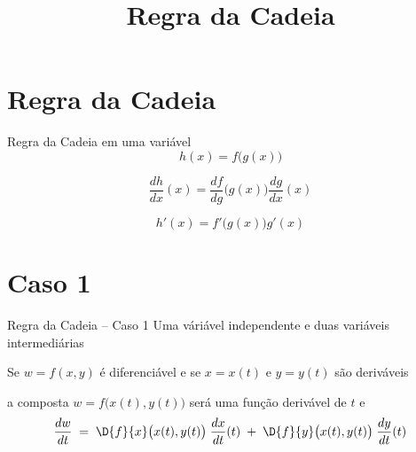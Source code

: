 
\usepackage{calculo_varias_variaveis-1}

\title {Regra da Cadeia}



\addtitle

\section{Regra da Cadeia}

\begin{frame}{Regra da Cadeia em uma variável}
    \[
        h(x) = f\big(g(x)\big)
    \]

    \pause
    \vspace{\baselineskip}
    \[
        \frac{dh}{dx}(x) = \frac{df}{dg}\big(g(x)\big)\frac{dg}{dx}(x)
    \]

    \pause
    \vspace{\baselineskip}
    \[
        h'(x) = f'\big(g(x)\big) g'(x)
    \]
\end{frame}

\section{Caso 1}

\begin{frame}{Regra da Cadeia -- Caso 1}
    Uma váriável independente e duas variáveis intermediárias
    \vspace{\baselineskip}

    \pause
    Se \(w=f(x, y)\) é diferenciável
    \pause
    e se \(x=x(t)\) e \(y=y(t)\) são deriváveis

    \pause
    \vspace{.5\baselineskip}
    a composta \(w=f\big(x(t), y(t)\big)\) será uma função derivável de $t$ e
    \pause
    \[
        \frac{dw}{dt}
        \;=\; \D{f}{x}\big(x(t), y(t)\big)\; \frac{dx}{dt}(t)
        \;+\; \D{f}{y}\big(x(t), y(t)\big)\; \frac{dy}{dt}(t)
    \]
\end{frame}

